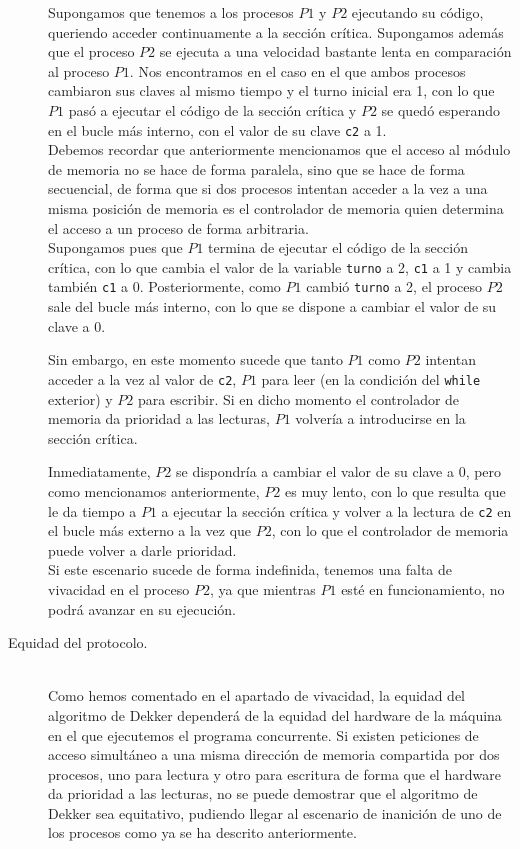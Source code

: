 \begin{description}
    Supongamos que tenemos a los procesos $P1$ y $P2$ ejecutando su código, queriendo acceder continuamente a la sección crítica. Supongamos además que el proceso $P2$ se ejecuta a una velocidad bastante lenta en comparación al proceso $P1$. Nos encontramos en el caso en el que ambos procesos cambiaron sus claves al mismo tiempo y el turno inicial era 1, con lo que $P1$ pasó a ejecutar el código de la sección crítica y $P2$ se quedó esperando en el bucle más interno, con el valor de su clave \verb|c2| a 1.\\

    Debemos recordar que anteriormente mencionamos que el acceso al módulo de memoria no se hace de forma paralela, sino que se hace de forma secuencial, de forma que si dos procesos intentan acceder a la vez a una misma posición de memoria es el controlador de memoria quien determina el acceso a un proceso de forma arbitraria.\\

    Supongamos pues que $P1$ termina de ejecutar el código de la sección crítica, con lo que cambia el valor de la variable \verb|turno| a 2, \verb|c1| a 1 y cambia también \verb|c1| a 0. Posteriormente, como $P1$ cambió \verb|turno| a 2, el proceso $P2$ sale del bucle más interno, con lo que se dispone a cambiar el valor de su clave a 0.

    Sin embargo, en este momento sucede que tanto $P1$ como $P2$ intentan acceder a la vez al valor de \verb|c2|, $P1$ para leer (en la condición del \verb|while| exterior) y $P2$ para escribir. Si en dicho momento el controlador de memoria da prioridad a las lecturas, $P1$ volvería a introducirse en la sección crítica.

    Inmediatamente, $P2$ se dispondría a cambiar el valor de su clave a 0, pero como mencionamos anteriormente, $P2$ es muy lento, con lo que resulta que le da tiempo a $P1$ a ejecutar la sección crítica y volver a la lectura de \verb|c2| en el bucle más externo a la vez que $P2$, con lo que el controlador de memoria puede volver a darle prioridad.\\

    Si este escenario sucede de forma indefinida, tenemos una falta de vivacidad en el proceso $P2$, ya que mientras $P1$ esté en funcionamiento, no podrá avanzar en su ejecución.

    \item [Equidad del protocolo.]~\\
    Como hemos comentado en el apartado de vivacidad, la equidad del algoritmo de Dekker dependerá de la equidad del hardware de la máquina en el que ejecutemos el programa concurrente. Si existen peticiones de acceso simultáneo a una misma dirección de memoria compartida por dos procesos, uno para lectura y otro para escritura de forma que el hardware da prioridad a las lecturas, no se puede demostrar que el algoritmo de Dekker sea equitativo, pudiendo llegar al escenario de inanición de uno de los procesos como ya se ha descrito anteriormente.
\end{description}

